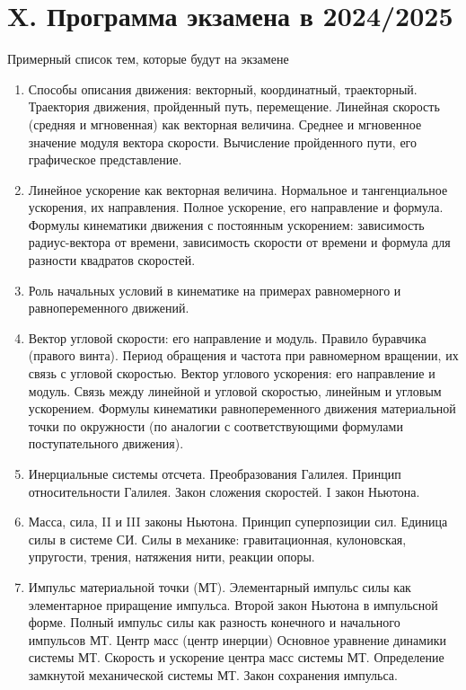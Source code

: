 \documentclass[12pt]{article}
\begin{document}
    \clearpage

    \section{X. Программа экзамена в 2024/2025}

    Примерный список тем, которые будут на экзамене

    \begin{enumerate}
        \item Способы описания движения: векторный, координатный, траекторный. Траектория движения, пройденный путь, перемещение. Линейная скорость (средняя и мгновенная) как векторная величина. Среднее и мгновенное значение модуля вектора скорости. Вычисление пройденного пути, его графическое представление.
        \item Линейное ускорение как векторная величина. Нормальное и тангенциальное ускорения, их направления. Полное ускорение, его направление и формула. Формулы кинематики движения с постоянным ускорением: зависимость радиус-вектора от времени, зависимость скорости от времени и формула для разности квадратов скоростей.
        \item Роль начальных условий в кинематике на примерах равномерного и равнопеременного движений.
        \item Вектор угловой скорости: его направление и модуль. Правило буравчика (правого винта). Период обращения и частота при равномерном вращении, их связь с угловой скоростью. Вектор углового ускорения: его направление и модуль. Связь между линейной и угловой скоростью, линейным и угловым ускорением. Формулы кинематики равнопеременного движения материальной точки по окружности (по аналогии с соответствующими формулами поступательного движения).
        \item Инерциальные системы отсчета. Преобразования Галилея. Принцип относительности Галилея. Закон сложения скоростей. I закон Ньютона.
        \item Масса, сила, II и III законы Ньютона. Принцип суперпозиции сил. Единица силы в системе СИ. Силы в механике: гравитационная, кулоновская, упругости, трения, натяжения нити, реакции опоры.
        \item Импульс материальной точки (МТ). Элементарный импульс силы как элементарное приращение импульса. Второй закон Ньютона в импульсной форме. Полный импульс силы как разность конечного и начального импульсов МТ. Центр масс (центр инерции) Основное уравнение динамики системы МТ. Скорость и ускорение центра масс системы МТ. Определение замкнутой механической системы МТ. Закон сохранения импульса.

\end{enumerate}
\end{document}
